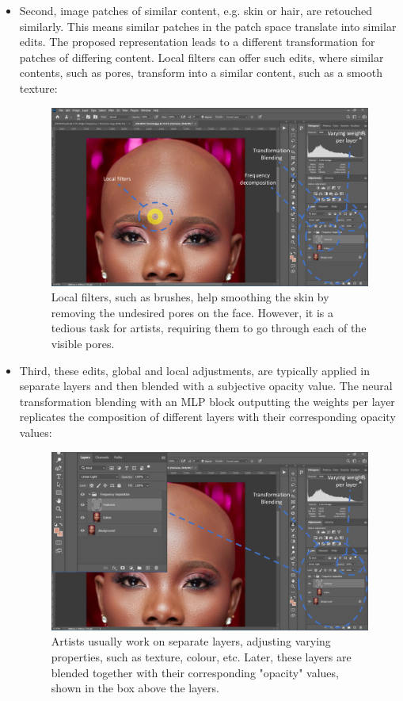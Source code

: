 \begin{itemize}
\item Second, image patches of similar content, e.g. skin or hair, are retouched similarly. This means similar patches in the patch space translate into similar edits. The proposed representation leads to a different transformation for patches of differing content. Local filters can offer such edits, where similar contents, such as pores, transform into a similar content, such as a smooth texture:
\begin{figure}[ht]
\centering
\includegraphics[width=\columnwidth]{Chapters/detail-retouching-figs/PS3.pdf}
    \caption{Local filters, such as brushes, help smoothing the skin by removing the undesired pores on the face. However, it is a tedious task for artists, requiring them to go through each of the visible pores.}

\label{fig:PS-brush}
\end{figure}

\item Third, these edits, global and local adjustments, are typically applied in separate layers and then blended with a subjective opacity value. The neural transformation blending with an MLP block outputting the weights per layer replicates the composition of different layers with their corresponding opacity values:

\begin{figure}[ht]
\centering
\includegraphics[width=\columnwidth]{Chapters/detail-retouching-figs/PS2.pdf}
    \caption{Artists usually work on separate layers, adjusting varying properties, such as texture, colour, etc. Later, these layers are blended together with their corresponding "opacity" values, shown in the box above the layers.}


\end{figure}
\end{itemize}
